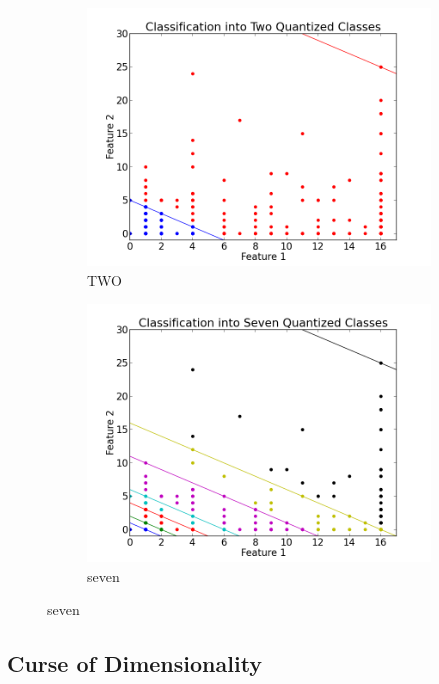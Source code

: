 \documentclass[12pt,notitlepage,twoside]{scrreprt}
\begin{document}
\begin{figure}[h!]
\centering
\begin{subfigure}[b]{.49\textwidth}
  \centering
  \includegraphics[width=1.1\linewidth]{figs/two.png}
  \caption{TWO}
  \label{def}
\end{subfigure}
%
\begin{subfigure}[b]{.49\textwidth}
  \centering
  \includegraphics[width=1.1\linewidth]{figs/seven.png}
  \caption{seven}
  \label{html}
\end{subfigure}
\end{figure}

\subsection{Curse of Dimensionality}
\end{document}
